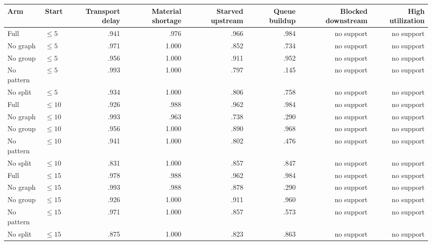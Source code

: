 \documentclass[10pt,a4paper]{article}
\begin{document}
\begin{landscape}
\begin{center}
\scriptsize
\begin{tabular}{llrrrrrr}
\toprule
Arm & Start & Transport delay & Material shortage & Starved upstream &
Queue buildup & Blocked downstream & High utilization \\
\midrule
Full     & $\leq5$  & .941 & .976 & .966 & .984 & no support & no support \\
No graph & $\leq5$  & .971 & 1.000 & .852 & .734 & no support & no support \\
No group & $\leq5$  & .956 & 1.000 & .911 & .952 & no support & no support \\
No pattern & $\leq5$  & .993 & 1.000 & .797 & .145 & no support & no support \\
No split   & $\leq5$  & .934 & 1.000 & .806 & .758 & no support & no support \\
\midrule
Full     & $\leq10$ & .926 & .988 & .962 & .984 & no support & no support \\
No graph & $\leq10$ & .993 & .963 & .738 & .290 & no support & no support \\
No group & $\leq10$ & .956 & 1.000 & .890 & .968 & no support & no support \\
No pattern & $\leq10$ & .941 & 1.000 & .802 & .476 & no support & no support \\
No split   & $\leq10$ & .831 & 1.000 & .857 & .847 & no support & no support \\
\midrule
Full     & $\leq15$ & .978 & .988 & .962 & .984 & no support & no support \\
No graph & $\leq15$ & .993 & .988 & .878 & .290 & no support & no support \\
No group & $\leq15$ & .926 & 1.000 & .911 & .960 & no support & no support \\
No pattern & $\leq15$ & .971 & 1.000 & .857 & .573 & no support & no support \\
No split   & $\leq15$ & .875 & 1.000 & .823 & .863 & no support & no support \\
\bottomrule
\end{tabular}
\end{center}
\end{landscape}
\end{document}
